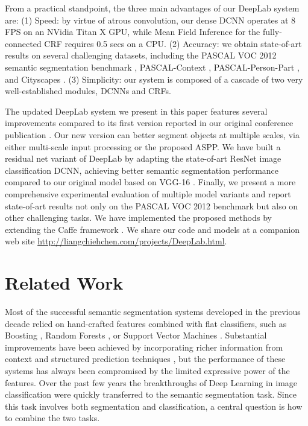 \documentclass[10pt,journal,compsoc]{IEEEtran}
\begin{document}
From a practical standpoint, the three main advantages of our DeepLab
system are: (1) Speed: by virtue of atrous convolution, our dense DCNN operates
at 8 FPS on an NVidia Titan X GPU, while Mean Field Inference for the
fully-connected CRF requires 0.5 secs on a CPU. (2) Accuracy: we obtain
state-of-art results on several challenging datasets, including the PASCAL VOC 2012
semantic segmentation benchmark \cite{everingham2014pascal}, PASCAL-Context
\cite{mottaghi2014role}, PASCAL-Person-Part \cite{chen_cvpr14}, and Cityscapes
\cite{Cordts2016Cityscapes}. (3) Simplicity: our system is composed of a cascade of
two very well-established modules, DCNNs and CRFs.


The updated DeepLab system we present in this paper features several
improvements compared to its first version reported in our original conference
publication \cite{chen2014semantic}. Our new version can better segment objects
at multiple scales, via either multi-scale input processing \cite{farabet2013learning, lin2015efficient, chen2015attention} or the 
proposed ASPP. We have built a residual net variant of DeepLab by adapting
the state-of-art ResNet \cite{he2015deep} image classification DCNN, achieving
better semantic segmentation performance compared to our original model based on
VGG-16 \cite{simonyan2014very}. Finally, we present a more comprehensive
experimental evaluation of multiple model variants and report state-of-art
results not only on the PASCAL VOC 2012 benchmark but also on other challenging
tasks. We have implemented the proposed methods by extending
the Caffe framework \cite{jia2014caffe}. We share our code and models at a
companion web site \url{http://liangchiehchen.com/projects/DeepLab.html}.




 \section{Related Work}
Most of the successful semantic segmentation systems developed in the previous decade relied on hand-crafted features 
combined with flat classifiers, such as Boosting \cite{TuB10,shotton2009textonboost}, Random Forests \cite{shotton2008semantic}, or Support Vector Machines \cite{FulkersonVS09}. Substantial improvements have been achieved
 by incorporating richer information from context
\cite{carreira2012semantic} 
and structured prediction techniques \cite{he2004multiscale,ladicky2009associative,carreira2012cpmc,krahenbuhl2011efficient}, but
the performance of these systems has always been compromised by the limited expressive power of the features.
Over the past few years the breakthroughs of Deep Learning in image classification were quickly transferred to the semantic 
segmentation task. Since this task involves both segmentation and classification, a central question is how to combine the two tasks. 
\end{document}
